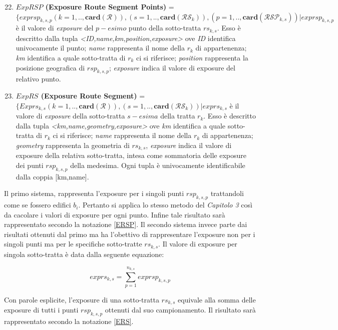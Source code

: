 \begin{enumerate}
\setcounter{enumi}{21}
\item \label{ERSP} \textbf{$ExpRSP$ (Exposure Route Segment Points)} =\\
$ \{exprsp_{k,s,p} (k=1,..,\mathbf{card}(\mathcal{R})),(s=1,..,\mathbf{card}(\mathcal{RS}_k)),(p=1,..,\mathbf{card}(\mathcal{RSP}_{k,s}))  | exprsp_{k,s,p} $ è il valore di \textit{exposure} del $p-esimo$ punto della sotto-tratta $rs_{k,s}$. Esso è descritto dalla tupla \textit{<ID,name,km,position,exposure>} ove \textit{ID} identifica univocamente il punto; \textit{name} rappresenta il nome della $r_k$ di appartenenza; \textit{km} identifica a quale sotto-tratta di $r_k$ ci si riferisce; \textit{position} rappresenta la posizione geografica di $rsp_{k,s,p}$; \textit{exposure} indica il valore di exposure del relativo punto.

\item \label{ERS} \textbf{$ExpRS$ (Exposure Route Segment)} =\\$ \{Exprs_{k,s} (k=1,..,\mathbf{card}(\mathcal{R})),(s=1,..,\mathbf{card}(\mathcal{RS}_k)) | exprs_{k,s} $ è il valore di \textit{exposure} della sotto-tratta $s-esima$ della tratta $r_k$. Esso è descritto dalla tupla \textit{<km,name,geometry,exposure>} ove \textit{km} identifica a quale sotto-tratta di $r_k$ ci si riferisce; \textit{name} rappresenta il nome della $r_k$ di appartenenza; \textit{geometry} rappresenta la geometria di $rs_{k,s}$, \textit{exposure} indica il valore di exposure della relativa sotto-tratta, intesa come sommatoria delle exposure dei punti $rsp_{k,s,p}$ della medesima. Ogni tupla è univocamente identificabile dalla coppia [km,name].

\end{enumerate}
\noindent Il primo sistema, rappresenta l'exposure per i singoli punti $rsp_{k,s,p}$ trattandoli come se fossero edifici $b_i$. Pertanto si applica lo stesso metodo del \textit{Capitolo 3} così da cacolare i valori di exposure per ogni punto. Infine tale risultato sarà rappresentato secondo la notazione \ref{ERSP}.
\bigbreak
\noindent Il secondo sistema invece parte dai risultati ottenuti dal primo ma ha l'obettivo di rappresentare l'exposure non per i singoli punti ma per le specifiche sotto-tratte $rs_{k,s}$. Il valore di exposure per singola sotto-tratta è data dalla seguente equazione:

\begin{equation}\label{eq:exprs}
exprs_{k,s}=\sum_{p=1}^{n_{k,s}} exprsp_{k,s,p}
\end{equation}

\noindent Con parole esplicite, l'exposure di una sotto-tratta $rs_{k,s}$ equivale alla somma delle exposure di tutti i punti $rsp_{k,s,p}$ ottenuti dal suo campionamento. Il risultato sarà rappresentato secondo la notazione \ref{ERS}.